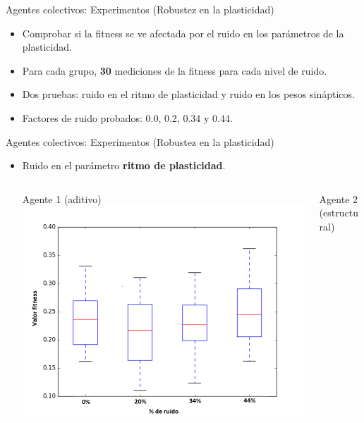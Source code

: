 \documentclass[aspectratio=169]{beamer}
\begin{document}
\begin{frame}{Agentes colectivos: Experimentos (Robustez en la plasticidad)}
  \begin{itemize}
    \item Comprobar si la fitness se ve afectada por el ruido en los parámetros de la plasticidad.
    \item Para cada grupo, \textbf{30} mediciones de la fitness para cada nivel de ruido.
    \item Dos pruebas: ruido en el ritmo de plasticidad y ruido en los pesos sinápticos.
    \item Factores de ruido probados: 0.0, 0.2, 0.34 y 0.44.
  \end{itemize}
\end{frame}

\begin{frame}{Agentes colectivos: Experimentos (Robustez en la plasticidad)}
  \begin{itemize}
    \item Ruido en el parámetro \textbf{ritmo de plasticidad}.
    \begin{columns}
      \begin{column}{0.47\textwidth}
        \begin{block}{Agente 1 (aditivo)}
        \includegraphics[width=1.0\textwidth,height=.6\textheight]{Imagenes/BoxPlotNP1}
      \end{block}
      \end{column}
      \begin{column}{0.5\textwidth}
        \begin{block}{Agente 2 (estructural)}

\end{block}
\end{column}
\end{columns}
\end{itemize}
\end{frame}
\end{document}
